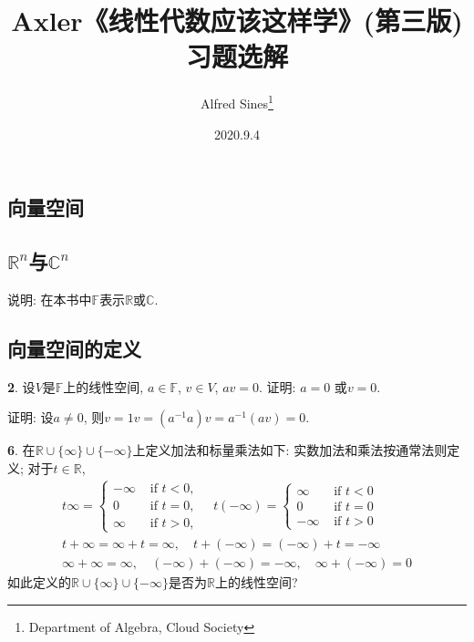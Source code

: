\documentclass[12pt,a4paper]{article}
\begin{document}
\begin{CJK*}{GBK}{song}

\Large
\title{\textbf{Axler《线性代数应该这样学》(第三版)\\ 习题选解}}
\author{Alfred Sines\footnote{Department of Algebra, Cloud Society}}
\date{2020.9.4}
\maketitle

\renewcommand{\contentsname}{\centerline{目录}}
\tableofcontents

\newpage
{}
\large
\setlength{\parindent}{0pt}
\setlength{\parskip}{0.5em}

\section{向量空间}

\subsection{$\mathbb{R}^n$与$\mathbb{C}^n$}

\par 说明: 在本书中$\mathbb{F}$表示$\mathbb{R}$或$\mathbb{C}$.

\subsection{向量空间的定义}

\par \textbf{2}. 设$V$是$\mathbb{F}$上的线性空间, $a\in \mathbb{F}$, $v\in V$, $av=0$. 证明: $a=0$ 或$v=0$.
\par 证明: 设$a\neq 0$, 则$v=1v=(a^{-1}a)v=a^{-1}(av)=0$.

\par \textbf{6}. 在$\mathbb{R}\cup \{\infty \} \cup \{-\infty\}$上定义加法和标量乘法如下: 实数加法和乘法按通常法则定义; 对于$t\in \mathbb{R}$,
\begin{equation*}
\begin{array}{c}
t \infty=\left\{\begin{array}{ll}
-\infty & \text { if } t<0, \\
0 & \text { if } t=0, \\
\infty & \text { if } t>0,
\end{array} \quad t(-\infty)=\left\{\begin{array}{ll}
\infty & \text { if } t<0 \\
0 & \text { if } t=0 \\
-\infty & \text { if } t>0
\end{array}\right.\right. \\
t+\infty=\infty+t=\infty, \quad t+(-\infty)=(-\infty)+t=-\infty \\
\infty+\infty=\infty, \quad(-\infty)+(-\infty)=-\infty, \quad \infty+(-\infty)=0
\end{array}
\end{equation*}
如此定义的$\mathbb{R}\cup \{\infty \} \cup \{-\infty\}$是否为$\mathbb{R}$上的线性空间?


\end{CJK*}
\end{document}
